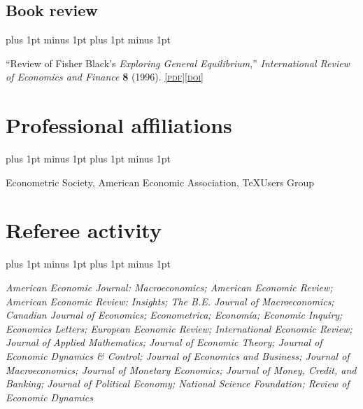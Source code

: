\documentclass[letterpaper]{article}
\renewenvironment{itemize}{
  \begin{list}{}{
    \setlength{\leftmargin}{1.5em}
    \itemsep -1pt plus 1pt minus 1pt
    \topsep -1pt plus 1pt minus 1pt
  }
}{
  \end{list}
}
\newcommand{\pdf}[1]{\href{#1}{\scriptsize\textsc{[pdf]}}}
\newcommand{\doi}[1]{\href{http://dx.doi.org/#1}{\scriptsize\textsc{[doi]}}}
\begin{document}
\subsection*{Book review}
\begin{itemize}
\item ``Review of Fisher Black's \textit{Exploring General Equilibrium},'' \textit{International Review of Economics and Finance} \textbf{8} (1996). \pdf{https://jimdolmas.github.io/assets/fisher_black.pdf}\doi{10.1016/S1059-0560(96)90038-6}
\end{itemize}

\section*{Professional affiliations}
\begin{itemize}
\item Econometric Society, American Economic Association, \TeX Users Group
\end{itemize}

\section*{Referee activity}
\begin{itemize}
\item\textit{American Economic Journal: Macroeconomics; American Economic Review; American Economic Review: Insights; The B.E. Journal of Macroeconomics; Canadian Journal of Economics; Econometrica; Econom\'{i}a; Economic Inquiry; Economics Letters; European Economic Review; International Economic Review; Journal of Applied Mathematics; Journal of Economic Theory; Journal of Economic Dynamics \& Control; Journal of Economics and Business; Journal of Macroeconomics; Journal of Monetary Economics; Journal of Money, Credit, and Banking; Journal of Political Economy; National Science Foundation; Review of Economic Dynamics}
\end{itemize}
\end{document}
